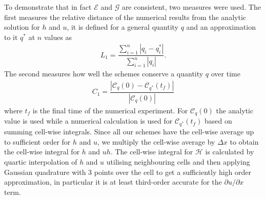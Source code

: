 \documentclass[SingleSpace,12pt,Proceedings]{Serre_ASCE}
\begin{document}
To demonstrate that in fact $\mathcal{E}$ and $\mathcal{G}$ are consistent, two measures were used. The first measures the relative distance of the numerical results from the analytic solution for $h$ and $u$, it is defined for a general quantity $q$ and an approximation to it $q^*$ at $n$ values as
\begin{gather}
L_1 = \dfrac{\sum_{i = 1}^{n} \left| q_i - q^*_i\right|}{\sum_{i = 1}^{n} \left| q_i\right|}.
\end{gather}
The second measures how well the schemes conserve a quantity $q$ over time
\begin{gather}
C_1 = \dfrac{\left| \mathcal{C}_q(0) - \mathcal{C}_{q^*}(t_f) \right|}{\left| \mathcal{C}_q(0) \right|}
\end{gather}
where $t_f$ is the final time of the numerical experiment. For $\mathcal{C}_q(0)$ the analytic value is used while a numerical calculation is used for $\mathcal{C}_{q^*}(t_f)$ based on summing cell-wise integrals. Since all our schemes have the cell-wise average up to sufficient order for $h$ and $u$,  we multiply the cell-wise average by $\Delta x$ to obtain the cell-wise integral for $h$ and $uh$. The cell-wise integral for $\mathcal{H}$ is calculated by quartic interpolation of $h$ and $u$ utilising neighbouring cells and then applying Gaussian quadrature with 3 points over the cell to get a sufficiently high order approximation, in particular it is at least third-order accurate for the $\partial u / \partial x$ term. 
%
\end{document}
